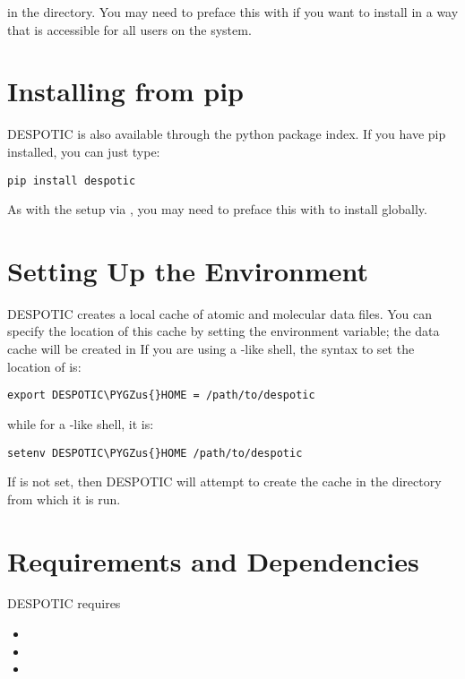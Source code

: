 \documentclass[letterpaper,10pt,english]{sphinxmanual}
\def\PYGZus{\char`\_}
\begin{document}
in the  directory. You may need to preface this with
 if you want to install in a way that is accessible for all
users on the system.


\section{Installing from pip}
\label{installation:installing-from-pip}
DESPOTIC is also available through the python package index. If you
have pip installed, you can just type:

\begin{Verbatim}[commandchars=\\\{\}]
pip install despotic
\end{Verbatim}

As with the setup via , you may need to preface this with
 to install globally.


\section{Setting Up the Environment}
\label{installation:setting-up-the-environment}
DESPOTIC creates a local cache of atomic and molecular data files. You
can specify the location of this cache by setting the
 environment variable; the data cache will be
created in  If you are using a -like
shell, the syntax to set the location of  is:

\begin{Verbatim}[commandchars=\\\{\}]
export DESPOTIC\PYGZus{}HOME = /path/to/despotic
\end{Verbatim}

while for a -like shell, it is:

\begin{Verbatim}[commandchars=\\\{\}]
setenv DESPOTIC\PYGZus{}HOME /path/to/despotic
\end{Verbatim}

If  is not set, then DESPOTIC will attempt to create
the cache in the directory from which it is run.


\section{Requirements and Dependencies}
\label{installation:requirements-and-dependencies}
DESPOTIC requires
\begin{itemize}
\item {} 

\item {} 

\item {} 

\end{itemize}
\end{document}
